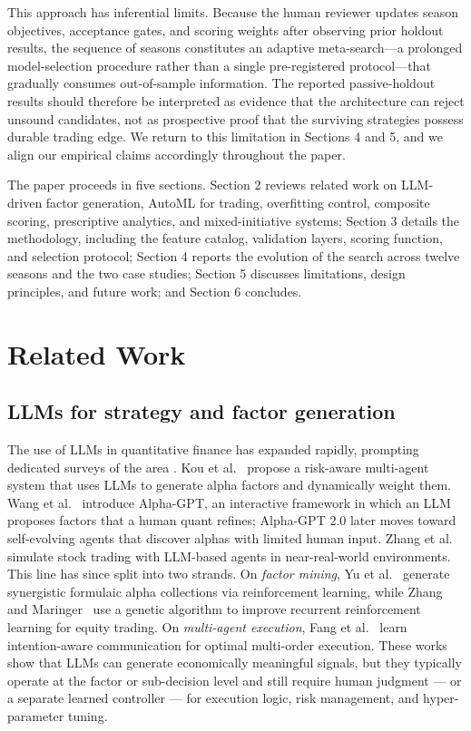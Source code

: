 \documentclass[11pt,a4paper]{article}
\begin{document}
This approach has inferential limits. Because the human reviewer updates season objectives, acceptance gates, and scoring weights after observing prior holdout results, the sequence of seasons constitutes an adaptive meta-search---a prolonged model-selection procedure rather than a single pre-registered protocol---that gradually consumes out-of-sample information. The reported passive-holdout results should therefore be interpreted as evidence that the architecture can reject unsound candidates, not as prospective proof that the surviving strategies possess durable trading edge. We return to this limitation in Sections 4 and 5, and we align our empirical claims accordingly throughout the paper.

The paper proceeds in five sections. Section 2 reviews related work on LLM-driven factor generation, AutoML for trading, overfitting control, composite scoring, prescriptive analytics, and mixed-initiative systems; Section 3 details the methodology, including the feature catalog, validation layers, scoring function, and selection protocol; Section 4 reports the evolution of the search across twelve seasons and the two case studies; Section 5 discusses limitations, design principles, and future work; and Section 6 concludes.

\section{Related Work}\label{related-work}

\subsection{LLMs for strategy and factor generation}\label{llms-for-strategy-and-factor-generation}

The use of LLMs in quantitative finance has expanded rapidly, prompting dedicated surveys of the area \citep{jadhav_mirza_2025}. Kou et al.~\citep{kou_2024} propose a risk-aware multi-agent system that uses LLMs to generate alpha factors and dynamically weight them. Wang et al.~\citep{wang_2023} introduce Alpha-GPT, an interactive framework in which an LLM proposes factors that a human quant refines; Alpha-GPT 2.0 \citep{yuan_2024} later moves toward self-evolving agents that discover alphas with limited human input. Zhang et al.~\citep{zhang_2024} simulate stock trading with LLM-based agents in near-real-world environments. This line has since split into two strands. On \emph{factor mining}, Yu et al.~\citep{yu_2023_synergistic_alpha} generate synergistic formulaic alpha collections via reinforcement learning, while Zhang and Maringer~\citep{zhang_maringer_2016} use a genetic algorithm to improve recurrent reinforcement learning for equity trading. On \emph{multi-agent execution}, Fang et al.~\citep{fang_2023_multi_agent} learn intention-aware communication for optimal multi-order execution. These works show that LLMs can generate economically meaningful signals, but they typically operate at the factor or sub-decision level and still require human judgment --- or a separate learned controller --- for execution logic, risk management, and hyper-parameter tuning.
\end{document}
